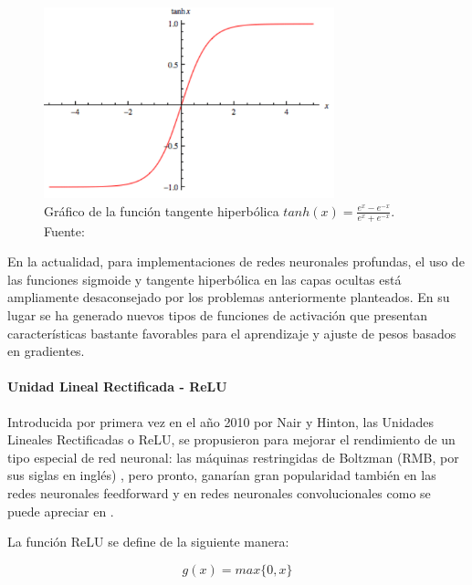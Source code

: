             \begin{figure}[!h] 
                \centering
                \includegraphics[width=0.75\textwidth]{img/tanh}
                \caption[Gráfico de la función tangente hiperbólica]{Gráfico de la función tangente hiperbólica $tanh(x) = \frac{e^x - e^{-x}}{e^x + e^{-x}}$. Fuente: \cite{wang_2016} }
                \label{fig:tanh}
            \end{figure}

            En la actualidad, para implementaciones de redes neuronales profundas, el uso de las funciones sigmoide y tangente 
            hiperbólica en las capas ocultas está ampliamente desaconsejado por los problemas anteriormente planteados. En su 
            lugar se ha generado nuevos tipos de funciones de activación que presentan características bastante favorables 
            para el aprendizaje y ajuste de pesos basados en gradientes.

            \paragraph{Unidad Lineal Rectificada - ReLU}\label{sec:relu}
            Introducida por primera vez en el año 2010 por Nair y Hinton, las Unidades Lineales Rectificadas o ReLU, se 
            propusieron para mejorar el rendimiento de un tipo especial de red neuronal: las máquinas restringidas de Boltzman 
            (RMB, por sus siglas en inglés) \cite{nair2010rectified}, pero pronto, ganarían gran popularidad también en las 
            redes neuronales feedforward y en redes neuronales convolucionales como se puede apreciar en \cite{krizhevsky2012imagenet}.
            
            La función ReLU se define de la siguiente manera:

            \begin{equation}\label{eq:relu}
                g(x) = max\{0,x\}
            \end{equation}

